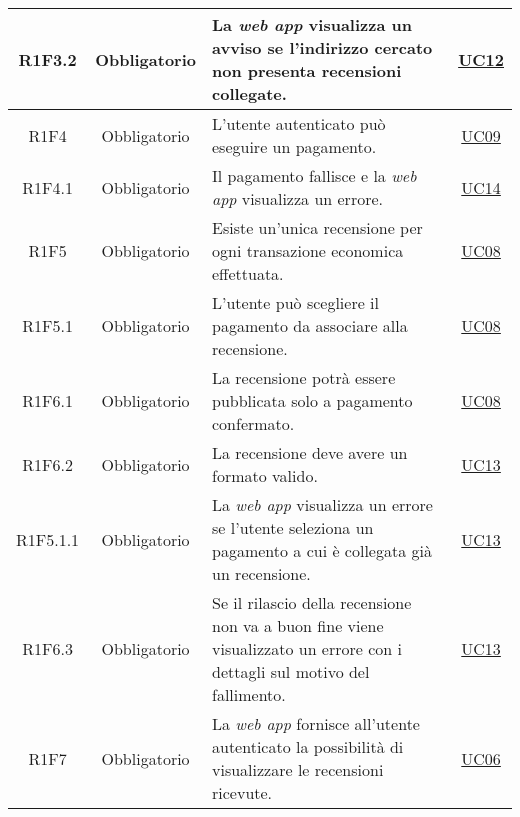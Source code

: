 \begin{longtable}{c c p{6cm} c}
            R1F3.2 &
            Obbligatorio &
            La \textit{web app} visualizza un avviso se l'indirizzo cercato non presenta recensioni collegate. &
            \hyperref[UC12]{UC12} \\
            \hline

            R1F4 &
            Obbligatorio &
            L'utente autenticato può eseguire un pagamento. &
            \hyperref[UC09]{UC09} \\
            \hline

            R1F4.1 &
            Obbligatorio &
            Il pagamento fallisce e la \textit{web app} visualizza un errore. &
            \hyperref[UC14]{UC14} \\
            \hline

            R1F5 &
            Obbligatorio &
            Esiste un'unica recensione per ogni transazione economica effettuata. &
            \hyperref[UC08]{UC08} \\
            \hline

            R1F5.1 &
            Obbligatorio &
        	L'utente può scegliere il pagamento da associare alla recensione.&
            \hyperref[UC08]{UC08} \\
            \hline

            R1F6.1 &
            Obbligatorio &
        	La recensione potrà essere pubblicata solo a pagamento confermato. &
            \hyperref[UC08]{UC08} \\
            \hline

            R1F6.2 &
            Obbligatorio &
        	La recensione deve avere un formato valido. &
            \hyperref[UC13]{UC13} \\
            \hline

            R1F5.1.1 &
            Obbligatorio &
        	La \textit{web app} visualizza un errore se l'utente seleziona un pagamento a cui è collegata già un recensione.&
            \hyperref[UC13]{UC13} \\
            \hline

            R1F6.3 &
            Obbligatorio &
        	Se il rilascio della recensione non va a buon fine viene visualizzato un errore con  i dettagli sul motivo del fallimento. &
            \hyperref[UC13]{UC13} \\
            \hline

            R1F7 &
            Obbligatorio &
        	La \textit{web app} fornisce all'utente autenticato la possibilità di visualizzare le recensioni ricevute.&
            \hyperref[UC06]{UC06} \\
            \hline


\end{longtable}
